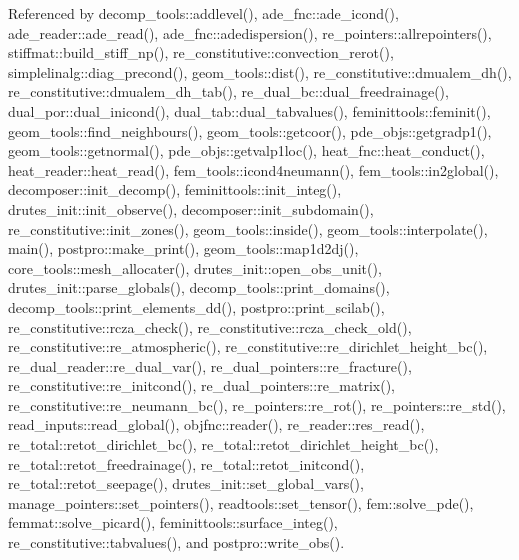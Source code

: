 Referenced by decomp\+\_\+tools\+::addlevel(), ade\+\_\+fnc\+::ade\+\_\+icond(), ade\+\_\+reader\+::ade\+\_\+read(), ade\+\_\+fnc\+::adedispersion(), re\+\_\+pointers\+::allrepointers(), stiffmat\+::build\+\_\+stiff\+\_\+np(), re\+\_\+constitutive\+::convection\+\_\+rerot(), simplelinalg\+::diag\+\_\+precond(), geom\+\_\+tools\+::dist(), re\+\_\+constitutive\+::dmualem\+\_\+dh(), re\+\_\+constitutive\+::dmualem\+\_\+dh\+\_\+tab(), re\+\_\+dual\+\_\+bc\+::dual\+\_\+freedrainage(), dual\+\_\+por\+::dual\+\_\+inicond(), dual\+\_\+tab\+::dual\+\_\+tabvalues(), feminittools\+::feminit(), geom\+\_\+tools\+::find\+\_\+neighbours(), geom\+\_\+tools\+::getcoor(), pde\+\_\+objs\+::getgradp1(), geom\+\_\+tools\+::getnormal(), pde\+\_\+objs\+::getvalp1loc(), heat\+\_\+fnc\+::heat\+\_\+conduct(), heat\+\_\+reader\+::heat\+\_\+read(), fem\+\_\+tools\+::icond4neumann(), fem\+\_\+tools\+::in2global(), decomposer\+::init\+\_\+decomp(), feminittools\+::init\+\_\+integ(), drutes\+\_\+init\+::init\+\_\+observe(), decomposer\+::init\+\_\+subdomain(), re\+\_\+constitutive\+::init\+\_\+zones(), geom\+\_\+tools\+::inside(), geom\+\_\+tools\+::interpolate(), main(), postpro\+::make\+\_\+print(), geom\+\_\+tools\+::map1d2dj(), core\+\_\+tools\+::mesh\+\_\+allocater(), drutes\+\_\+init\+::open\+\_\+obs\+\_\+unit(), drutes\+\_\+init\+::parse\+\_\+globals(), decomp\+\_\+tools\+::print\+\_\+domains(), decomp\+\_\+tools\+::print\+\_\+elements\+\_\+dd(), postpro\+::print\+\_\+scilab(), re\+\_\+constitutive\+::rcza\+\_\+check(), re\+\_\+constitutive\+::rcza\+\_\+check\+\_\+old(), re\+\_\+constitutive\+::re\+\_\+atmospheric(), re\+\_\+constitutive\+::re\+\_\+dirichlet\+\_\+height\+\_\+bc(), re\+\_\+dual\+\_\+reader\+::re\+\_\+dual\+\_\+var(), re\+\_\+dual\+\_\+pointers\+::re\+\_\+fracture(), re\+\_\+constitutive\+::re\+\_\+initcond(), re\+\_\+dual\+\_\+pointers\+::re\+\_\+matrix(), re\+\_\+constitutive\+::re\+\_\+neumann\+\_\+bc(), re\+\_\+pointers\+::re\+\_\+rot(), re\+\_\+pointers\+::re\+\_\+std(), read\+\_\+inputs\+::read\+\_\+global(), objfnc\+::reader(), re\+\_\+reader\+::res\+\_\+read(), re\+\_\+total\+::retot\+\_\+dirichlet\+\_\+bc(), re\+\_\+total\+::retot\+\_\+dirichlet\+\_\+height\+\_\+bc(), re\+\_\+total\+::retot\+\_\+freedrainage(), re\+\_\+total\+::retot\+\_\+initcond(), re\+\_\+total\+::retot\+\_\+seepage(), drutes\+\_\+init\+::set\+\_\+global\+\_\+vars(), manage\+\_\+pointers\+::set\+\_\+pointers(), readtools\+::set\+\_\+tensor(), fem\+::solve\+\_\+pde(), femmat\+::solve\+\_\+picard(), feminittools\+::surface\+\_\+integ(), re\+\_\+constitutive\+::tabvalues(), and postpro\+::write\+\_\+obs().



